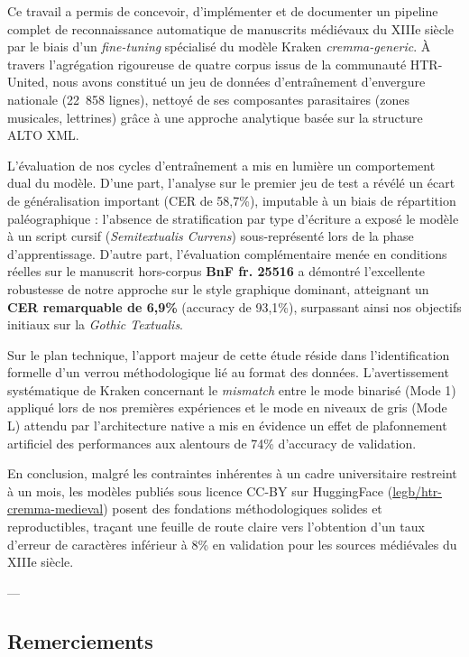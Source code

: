 ﻿\documentclass[twoside,twocolumn,10pt]{article}
\begin{document}
Ce travail a permis de concevoir, d'implémenter et de documenter un pipeline complet de reconnaissance automatique de manuscrits médiévaux du XIIIe siècle par le biais d'un \textit{fine-tuning} spécialisé du modèle Kraken \textit{cremma-generic}. À travers l'agrégation rigoureuse de quatre corpus issus de la communauté HTR-United, nous avons constitué un jeu de données d'entraînement d'envergure nationale (22~858 lignes), nettoyé de ses composantes parasitaires (zones musicales, lettrines) grâce à une approche analytique basée sur la structure ALTO XML.

L'évaluation de nos cycles d'entraînement a mis en lumière un comportement dual du modèle. D'une part, l'analyse sur le premier jeu de test a révélé un écart de généralisation important (CER de 58,7\%), imputable à un biais de répartition paléographique : l'absence de stratification par type d'écriture a exposé le modèle à un script cursif (\textit{Semitextualis Currens}) sous-représenté lors de la phase d'apprentissage. D'autre part, l'évaluation complémentaire menée en conditions réelles sur le manuscrit hors-corpus \textbf{BnF fr. 25516} a démontré l'excellente robustesse de notre approche sur le style graphique dominant, atteignant un \textbf{CER remarquable de 6,9\%} (accuracy de 93,1\%), surpassant ainsi nos objectifs initiaux sur la \textit{Gothic Textualis}.

Sur le plan technique, l'apport majeur de cette étude réside dans l'identification formelle d'un verrou méthodologique lié au format des données. L'avertissement systématique de Kraken concernant le \textit{mismatch} entre le mode binarisé (Mode 1) appliqué lors de nos premières expériences et le mode en niveaux de gris (Mode L) attendu par l'architecture native a mis en évidence un effet de plafonnement artificiel des performances aux alentours de 74\% d'accuracy de validation.

En conclusion, malgré les contraintes inhérentes à un cadre universitaire restreint à un mois, les modèles publiés sous licence CC-BY sur HuggingFace (\href{https://huggingface.co/legb/htr-cremma-medieval}{legb/htr-cremma-medieval}) posent des fondations méthodologiques solides et reproductibles, traçant une feuille de route claire vers l'obtention d'un taux d'erreur de caractères inférieur à 8\% en validation pour les sources médiévales du XIIIe siècle.

---
\balance
\vspace{0.5cm}
\fontsize{11}{13}\selectfont

\subsection*{Remerciements}
\end{document}
